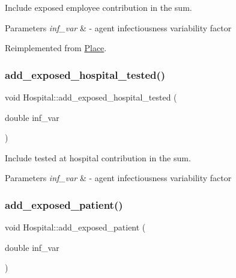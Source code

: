 Include exposed employee contribution in the sum. 


\begin{DoxyParams}{Parameters}
{\em inf\+\_\+var} & -\/ agent infectiousness variability factor \\
\hline
\end{DoxyParams}


Reimplemented from \hyperlink{classPlace_a96444ff0aa08a921598d0afb9c00cec8}{Place}.

\mbox{\label{classHospital_a278812e4a6436ab49badb9e26a81be3f}} 
\subsubsection{\texorpdfstring{add\+\_\+exposed\+\_\+hospital\+\_\+tested()}{add\_exposed\_hospital\_tested()}}
{\footnotesize\ttfamily void Hospital\+::add\+\_\+exposed\+\_\+hospital\+\_\+tested (\begin{DoxyParamCaption}\item[{double}]{inf\+\_\+var }\end{DoxyParamCaption})\hspace{0.3cm}{\ttfamily [inline]}}



Include tested at hospital contribution in the sum. 


\begin{DoxyParams}{Parameters}
{\em inf\+\_\+var} & -\/ agent infectiousness variability factor \\
\hline
\end{DoxyParams}
\mbox{\label{classHospital_a68dc4af05fc1fbca3d5c48c835e8eb72}} 
\subsubsection{\texorpdfstring{add\+\_\+exposed\+\_\+patient()}{add\_exposed\_patient()}}
{\footnotesize\ttfamily void Hospital\+::add\+\_\+exposed\+\_\+patient (\begin{DoxyParamCaption}\item[{double}]{inf\+\_\+var }\end{DoxyParamCaption})\hspace{0.3cm}{\ttfamily [inline]}}



